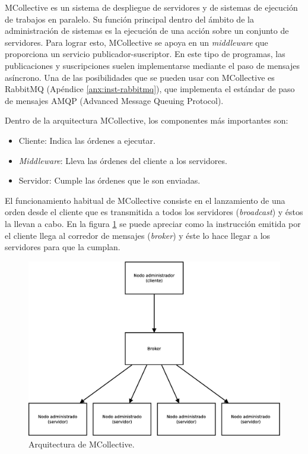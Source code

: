 MCollective es un sistema de despliegue de servidores y de sistemas de ejecución de trabajos en paralelo. Su función principal dentro del ámbito de la administración de sistemas es la ejecución de una acción sobre un conjunto de servidores. Para lograr esto, MCollective se apoya en un \emph{middleware} que proporciona un servicio publicador-suscriptor. En este tipo de programas, las publicaciones y suscripciones suelen implementarse mediante el paso de mensajes asíncrono. Una de las posibilidades que se pueden usar con MCollective es RabbitMQ (Apéndice \ref{anx:inst-rabbitmq}), que implementa el estándar de paso de mensajes AMQP (Advanced Message Queuing Protocol).

Dentro de la arquitectura MCollective, los componentes más importantes son:
\begin{itemize}
\item Cliente: Indica las órdenes a ejecutar.
\item \emph{Middleware}: Lleva las órdenes del cliente a los servidores.
\item Servidor: Cumple las órdenes que le son enviadas.
\end{itemize}

El funcionamiento habitual de MCollective consiste en el lanzamiento de una orden desde el cliente que es transmitida a todos los servidores (\emph{broadcast}) y éstos la llevan a cabo. En la figura \ref{figure:arquitectura-mcollective} se puede apreciar como la instrucción emitida por el cliente llega al corredor de mensajes (\emph{broker}) y éste lo hace llegar a los servidores para que la cumplan.

\begin{figure} [!htbp]
  \centering
  \includegraphics[width=13.5cm]{figuras/Arquitectura_MCollective.eps}
  \caption{Arquitectura de MCollective.}
\label{figure:arquitectura-mcollective}
\end{figure}

